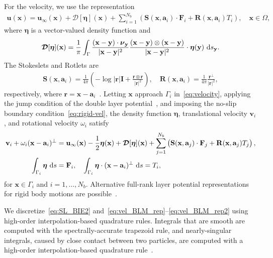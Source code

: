 \documentclass[prb,preprint,showpacs,preprintnumbers,amsmath,amssymb,longbibliography]{revtex4-1}
\renewcommand{\aa}{\mathbf{a}}
\newcommand{\DDD}{\boldsymbol{\mathcal{D}}}
\newcommand{\eeta}{\boldsymbol{\eta}}
\newcommand{\FF}{\mathbf{F}}
\newcommand{\nnu}{\boldsymbol{\nu}}
\newcommand{\rr}{\mathbf{r}}
\newcommand{\RR}{\mathbf{R}}
\renewcommand{\SS}{\mathbf{S}}
\newcommand{\xx}{\mathbf{x}}
\newcommand{\uu}{\mathbf{u}}
\renewcommand{\vv}{\mathbf{v}}
\newcommand{\yy}{\mathbf{y}}
\begin{document}
For the velocity, we use the representation
\begin{align}
  \label{eq:velocity}
  \uu(\xx) = \uu_\infty(\xx) + \DDD[\eeta](\xx) + 
    \sum_{i=1}^{N_b} \left(\SS(\xx,\aa_i) \cdot \FF_i + 
    \RR(\xx,\aa_i) T_i\right), \quad \xx \in \Omega,
\end{align}
where $\eeta$ is a vector-valued density function and
\begin{align}
  \DDD[\eeta](\xx) = \frac{1}{\pi} \int_{\Gamma} 
    \frac{(\xx - \yy) \cdot \nnu_\yy}{|\xx - \yy|^2}
    \frac{(\xx - \yy) \otimes (\xx - \yy)}{|\xx - \yy|^2}
    \cdot \eeta(\yy)\, \dif s_\yy.
\end{align}
The Stokeslets and Rotlets are
\begin{align}
  \SS(\xx,\aa_i) = \frac{1}{4\pi} \left(-\log |\rr|\mathbf{I} +
    \frac{\rr \otimes \rr}{|\rr|^2}\right), \quad 
  \RR(\xx,\aa_i) = \frac{1}{4\pi} \frac{\rr^\perp}{|\rr|^2}, 
\end{align}
respectively, where $\rr = \xx - \aa_i$~\cite{pow-mir1987}. Letting
$\xx$ approach $\Gamma_i$ in~\eqref{eq:velocity}, applying the jump
condition of the double layer potential~\cite{poz1992}, and imposing the
no-slip boundary condition~\eqref{eq:rigid-vel}, the density function
$\eeta$, translational velocity $\vv_i$, and rotational velocity
$\omega_i$ satisfy
\begin{alignat}{3}
  \label{eq:vel_BLM_rep}
  \vv_i + \omega_i (\xx - \aa_i)^\perp &= \uu_\infty(\xx)
    -\frac{1}{2} \eeta(\xx) + \DDD[\eeta](\xx) 
    + \sum_{j=1}^{N_b} 
    \left(\SS(\xx,\aa_j) \cdot \FF_j + \RR(\xx,\aa_j) T_j\right),\\
  \label{eq:vel_BLM_rep2}
  \int_{\Gamma_i} \eeta \, \dif s &= \mathbf{F}_i, \quad
  \int_{\Gamma_i} \eeta \cdot (\xx-\aa_i)^\perp \, \dif s = T_i,
\end{alignat}
for $\xx \in \Gamma_i$ and $i = 1,\ldots,N_b$.
Alternative full-rank layer potential
representations for rigid body motions are possible~\cite{rac-gre2016,
cor-gre-rac-vee2017}.

We discretize~\eqref{eq:SL_BIE2}
and~\eqref{eq:vel_BLM_rep}--\eqref{eq:vel_BLM_rep2} using high-order
interpolation-based quadrature rules. Integrals that are smooth are
computed with the spectrally-accurate trapezoid rule, and
nearly-singular integrals, caused by close contact between two
particles, are computed with a high-order interpolation-based quadrature
rule~\cite{qua-bir2014}.
\end{document}
